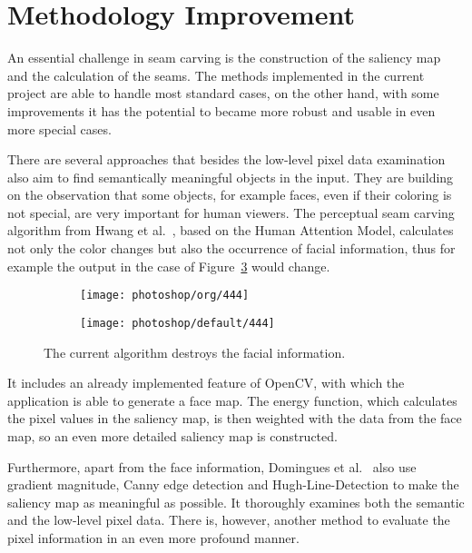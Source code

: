 \documentclass[draft,final]{vutinfth} %
\begin{document}
	\section{Methodology Improvement}
	An essential challenge in seam carving is the construction of the saliency map and the calculation of the seams. 
	The methods implemented in the current project are able to handle most standard cases, on the other hand, with some improvements it has the potential to became more robust and usable in even more special cases.\par 
	There are several approaches that besides the low-level pixel data examination also aim to find semantically meaningful objects in the input.
	They are building on the observation that some objects, for example faces, even if their coloring is not special, are very important for human viewers.
	The perceptual seam carving algorithm from Hwang et al.~\cite{hwang2008content}, based on the Human Attention Model, calculates not only the color changes but also the occurrence of facial information, thus for example the output in the case of Figure~\ref{fig:face} would change.
	\begin{figure}[h]
		\centering
		\begin{subfigure}[b]{0.45\columnwidth}
			\centering
			\texttt{[image: photoshop/org/444]}
			\label{fig:res:th1}
		\end{subfigure}
		\begin{subfigure}[b]{0.45\columnwidth}
			\centering
			\texttt{[image: photoshop/default/444]}
			\label{fig:res:th2}
		\end{subfigure}
		\caption{The current algorithm destroys the facial information.}
		\label{fig:face}
	\end{figure}  	
	It includes an already implemented feature of OpenCV, with which the application is able to generate a face map.
	The energy function, which calculates the pixel values in the saliency map, is then weighted with the data from the face map, so an even more detailed saliency map is constructed.\par 
	Furthermore, apart from the face information, Domingues et al.~\cite{domingues2010stream} also use gradient magnitude, Canny edge detection and Hugh-Line-Detection to make the saliency map as meaningful as possible. 
	It thoroughly examines both the semantic and the low-level pixel data.
	There is, however, another method to evaluate the pixel information in an even more profound manner.
\end{document}
